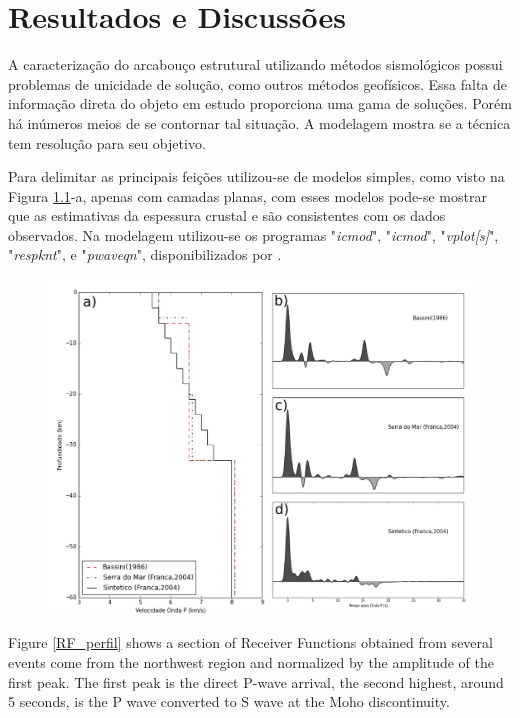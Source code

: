 \chapter{Resultados e Discussões}	

A caracterização do arcabouço estrutural utilizando métodos sismológicos possui problemas de unicidade de solução, como outros métodos geofísicos.  Essa falta de informação direta do objeto em estudo proporciona uma gama de soluções. Porém há inúmeros meios de se contornar tal situação. A modelagem mostra se a técnica tem resolução para seu objetivo.

Para delimitar as principais feições utilizou-se de modelos simples, como visto na Figura \ref{modelagem}-a, apenas com camadas planas, com esses modelos pode-se mostrar que as estimativas da espessura crustal e são consistentes com os dados observados. Na modelagem utilizou-se os programas "\textit{icmod}", "\textit{icmod}", "\textit{vplot[s]}", "\textit{respknt}",  e "\textit{pwaveqn}", disponibilizados por \cite{Ammon_waterlevel_1997}.

\begin{figure}[!ht]
\centering
\includegraphics[scale=0.5]{modelagem_RF.png}
\caption{}
\label{modelagem}
\end{figure}

Figure \ref{RF_perfil} shows a section of Receiver Functions obtained from several events come from the northwest region and normalized by the amplitude of the first peak. The first peak is the direct P-wave arrival, the second highest, around 5 seconds, is the P wave converted to S wave at the Moho discontinuity.


